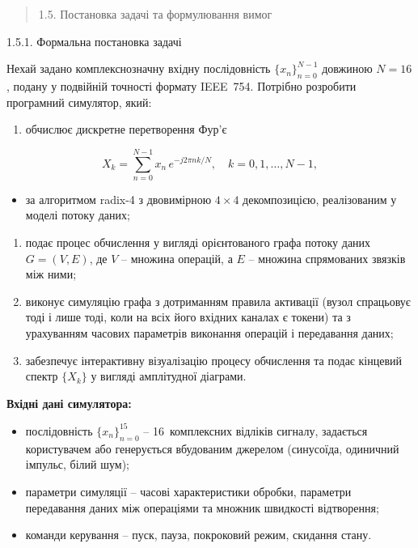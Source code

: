\documentclass[
]{article}
\begin{document}
\begin{quote}
\protect{}\label{ux43fux43eux441ux442ux430ux43dux43eux432ux43aux430-ux437ux430ux434ux430ux447ux456-ux442ux430-ux444ux43eux440ux43cux443ux43bux44eux432ux430ux43dux43dux44f-ux432ux438ux43cux43eux433}{}1.5.
Постановка задачі та формулювання вимог
\end{quote}

1.5.1. Формальна постановка задачі

Нехай задано комплекснозначну вхідну послідовність
\(\{ x_{n}\}_{n = 0}^{N - 1}\) довжиною \(N = 16\), подану у подвійній
точності формату IEEE~754. Потрібно розробити програмний симулятор,
який:

\begin{enumerate}
\def\labelenumi{\arabic{enumi}.}
\item
  обчислює дискретне перетворення Фур'є
\end{enumerate}

\[X_{k} = \sum_{n = 0}^{N - 1}x_{n}\, e^{- j2\pi nk/N},\quad k = 0,1,\ldots,N - 1,\]

\begin{itemize}
\item
  за алгоритмом radix-4 з двовимірною \(4 \times 4\) декомпозицією,
  реалізованим у моделі потоку даних;
\end{itemize}

\begin{enumerate}
\def\labelenumi{\arabic{enumi}.}
\item
  подає процес обчислення у вигляді орієнтованого графа потоку даних
  \(G = (V,E)\), де \(V\) -- множина операцій, а \(E\) -- множина
  спрямованих зв\textquotesingle язків між ними;
\item
  виконує симуляцію графа з дотриманням правила активації (вузол
  спрацьовує тоді і лише тоді, коли на всіх його вхідних каналах є
  токени) та з урахуванням часових параметрів виконання операцій і
  передавання даних;
\item
  забезпечує інтерактивну візуалізацію процесу обчислення та подає
  кінцевий спектр \(\{ X_{k}\}\) у вигляді амплітудної діаграми.
\end{enumerate}

\textbf{Вхідні дані симулятора:}

\begin{itemize}
\item
  послідовність \(\{ x_{n}\}_{n = 0}^{15}\) -- 16~комплексних відліків
  сигналу, задається користувачем або генерується вбудованим джерелом
  (синусоїда, одиничний імпульс, білий шум);
\item
  параметри симуляції -- часові характеристики обробки, параметри
  передавання даних між операціями та множник швидкості відтворення;
\item
  команди керування -- пуск, пауза, покроковий режим, скидання стану.
\end{itemize}
\end{document}
